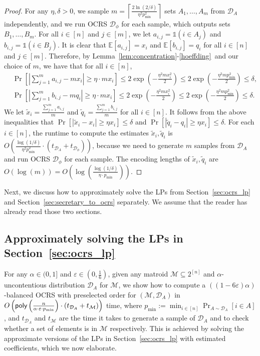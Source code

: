 \documentclass[11pt]{article}
\newcommand{\ceil}[1]{\left\lceil #1 \right\rceil}
\newcommand{\D}{\mathcal D}
\def \E {\mathbb{E}}
\newcommand{\M}{{\mathcal M}}
\newcommand{\eps}{\varepsilon}
\newcommand{\poly}{\textnormal{\sffamily poly}}
\begin{document}
\begin{proof}
For any $\eta,\delta>0$, we sample $m=\ceil{\frac{2\ln(2/\delta)}{\eta^2p_{\min}^2}}$ sets $A_1,\dots,A_m$ from $\D_A$ independently, and we run OCRS $\D_{\phi}$ for each sample, which outputs sets $B_1,\dots,B_m$. For all $i\in[n]$ and $j\in[m]$, we let $a_{i,j}=\mathds{1}(i\in A_j)$ and $b_{i,j}=\mathds{1}(i\in B_j)$. It is clear that $\E[a_{i,j}]=x_i$ and $\E[b_{i,j}]=q_i$ for all $i\in[n]$ and $j\in[m]$. Therefore, by Lemma~\ref{lem:concentration}-\ref{hoeffding}~and our choice of $m$, we have that for all $i\in[n]$,
\begin{align*}
&\Pr\left[\left|\sum\nolimits_{j=1}^m a_{i,j}-mx_i\right|\ge \eta\cdot mx_i\right]\le 2\exp\left(-\frac{\eta^2 m x_i^2}{2}\right)\le2\exp\left(-\frac{\eta^2 m p_{\min}^2}{2}\right)\le\delta,\\
&\Pr\left[\left|\sum\nolimits_{j=1}^m b_{i,j}-mq_i\right|\ge \eta\cdot mx_i\right]\le 2\exp\left(-\frac{\eta^2 m x_i^2}{2}\right)\le2\exp\left(-\frac{\eta^2 m p_{\min}^2}{2}\right)\le\delta.
\end{align*}
We let $\tilde{x}_i=\frac{\sum_{j=1}^m a_{i,j}}{m}$ and $\tilde{q}_i=\frac{\sum_{j=1}^m b_{i,j}}{m}$ for all $i\in[n]$. It follows from the above inequalities that $\Pr\left[|\tilde{x}_i-x_i|\ge\eta x_i\right]\le\delta$ and $\Pr\left[|\tilde{q}_i-q_i|\ge\eta x_i\right]\le\delta$. For each $i\in[n]$, the runtime to compute the estimates $\tilde{x}_i,\tilde{q}_i$ is $O\left(\frac{\log(1/\delta)}{\eta^2p_{\min}^2}\cdot(t_{\D_{A}}+t_{\D_{\phi}})\right)$, because we need to generate $m$ samples from $\D_A$ and run OCRS $\D_{\phi}$ for each sample. The encoding lengths of $\tilde{x}_i,\tilde{q}_i$ are $O(\log(m))=O\left(\log\left(\frac{\log(1/\delta)}{\eta\cdot p_{\min}}\right)\right)$.
\end{proof}
Next, we discuss how to approximately solve the LPs from Section~\ref{sec:ocrs_lp} and Section~\ref{sec:secretary_to_ocrs} separately. We assume that the reader has already read those two sections.

\subsection{Approximately solving the LPs in Section~\ref{sec:ocrs_lp}}
For any $\alpha\in(0,1]$ and $\eps\in\left(0,\frac{1}{6}\right)$, given any matroid $\M\subseteq2^{[n]}$ and $\alpha$-uncontentious distribution $\D_A$ for $\M$, we show how to compute a $((1-6\eps)\alpha)$-balanced OCRS with preselected order for $(\M,\D_A)$ in $O\left(\poly\left(\frac{n}{\alpha\cdot\eps\cdot p_{\min}}\right)\cdot(t_{\D_{A}}+t_{\M})\right)$ time, where $p_{\min}:=\min_{i\in[n]}\Pr_{A\sim\D_A}[i\in A]$, and $t_{\D_A}$ and $t_{\M}$ are the time it takes to generate a sample of $\D_A$ and to check whether a set of elements is in $\M$ respectively. This is achieved by solving the approximate versions of the LPs in Section~\ref{sec:ocrs_lp} with estimated coefficients, which we now elaborate.
\end{document}
